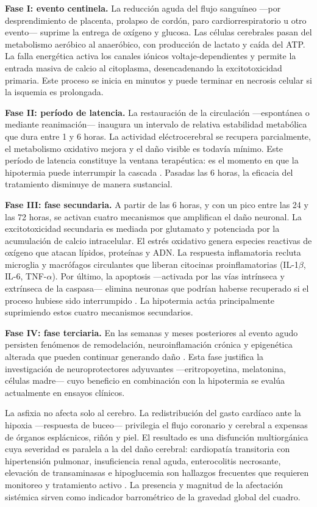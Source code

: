\documentclass[12pt]{article}
\begin{document}
\textbf{Fase I: evento centinela.} La reducción aguda del flujo sanguíneo
---por desprendimiento de placenta, prolapso de cordón, paro cardiorrespiratorio u
otro evento--- suprime la entrega de oxígeno y glucosa. Las células cerebrales pasan
del metabolismo aeróbico al anaeróbico, con producción de lactato y caída del ATP.
La falla energética activa los canales iónicos voltaje-dependientes y permite la
entrada masiva de calcio al citoplasma, desencadenando la excitotoxicidad primaria.
Este proceso se inicia en minutos y puede terminar en necrosis celular si la
isquemia es prolongada.

\textbf{Fase II: período de latencia.} La restauración de la circulación ---espontánea
o mediante reanimación--- inaugura un intervalo de relativa estabilidad metabólica que
dura entre 1 y 6 horas. La actividad eléctrocerebral se recupera parcialmente,
el metabolismo oxidativo mejora y el daño visible es todavía mínimo. Este período
de latencia constituye la ventana terapéutica: es el momento en que la hipotermia
puede interrumpir la cascada \parencite{edwards2010}. Pasadas las 6 horas, la
eficacia del tratamiento disminuye de manera sustancial.

\textbf{Fase III: fase secundaria.} A partir de las 6 horas, y con un pico entre las
24 y las 72 horas, se activan cuatro mecanismos que amplifican el daño neuronal.
La excitotoxicidad secundaria es mediada por glutamato y potenciada por la
acumulación de calcio intracelular. El estrés oxidativo genera especies reactivas de
oxígeno que atacan lípidos, proteínas y ADN. La respuesta inflamatoria recluta
microglia y macrófagos circulantes que liberan citocinas proinflamatorias
(IL-1$\beta$, IL-6, TNF-$\alpha$). Por último, la apoptosis ---activada por las vías
intrínseca y extrínseca de la caspasa--- elimina neuronas que podrían haberse
recuperado si el proceso hubiese sido interrumpido \parencite{volpe2012}. La
hipotermia actúa principalmente suprimiendo estos cuatro mecanismos secundarios.

\textbf{Fase IV: fase terciaria.} En las semanas y meses posteriores al evento
agudo persisten fenómenos de remodelación, neuroinflamación crónica y epigenética
alterada que pueden continuar generando daño \parencite{ferriero2004}. Esta fase
justifica la investigación de neuroprotectores adyuvantes ---eritropoyetina, melatonina,
células madre--- cuyo beneficio en combinación con la hipotermia se evalúa actualmente
en ensayos clínicos.

La asfixia no afecta solo al cerebro. La redistribución del gasto cardíaco ante la
hipoxia ---respuesta de buceo--- privilegia el flujo coronario y cerebral a expensas de
órganos esplácnicos, riñón y piel. El resultado es una disfunción multiorgánica cuya
severidad es paralela a la del daño cerebral: cardiopatía transitoria con hipertensión
pulmonar, insuficiencia renal aguda, enterocolitis necrosante, elevación de
transaminasas e hipoglucemia son hallazgos frecuentes que requieren monitoreo y
tratamiento activo \parencite{shankaran2005}. La presencia y magnitud de la afectación
sistémica sirven como indicador barrométrico de la gravedad global del cuadro.
\end{document}
